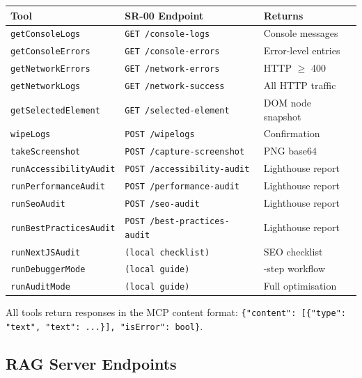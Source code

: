 \begin{longtable}[]{@{}
  >{\raggedright\arraybackslash}p{}
  >{\raggedright\arraybackslash}p{}
  >{\raggedright\arraybackslash}p{}@{}}
\toprule\noalign{}
\textbf{Tool} & \textbf{SR-00 Endpoint} & \textbf{Returns} \\
\midrule\noalign{}
\endhead
\bottomrule\noalign{}
\endlastfoot
\texttt{getConsoleLogs} & \texttt{GET /console-logs} & Console messages \\
\texttt{getConsoleErrors} & \texttt{GET /console-errors} & Error-level entries \\
\texttt{getNetworkErrors} & \texttt{GET /network-errors} & HTTP $\geq$ 400 \\
\texttt{getNetworkLogs} & \texttt{GET /network-success} & All HTTP traffic \\
\texttt{getSelectedElement} & \texttt{GET /selected-element} & DOM node snapshot \\
\texttt{wipeLogs} & \texttt{POST /wipelogs} & Confirmation \\
\texttt{takeScreenshot} & \texttt{POST /capture-screenshot} & PNG base64 \\
\texttt{runAccessibilityAudit} & \texttt{POST /accessibility-audit} & Lighthouse report \\
\texttt{runPerformanceAudit} & \texttt{POST /performance-audit} & Lighthouse report \\
\texttt{runSeoAudit} & \texttt{POST /seo-audit} & Lighthouse report \\
\texttt{runBestPracticesAudit} & \texttt{POST /best-practices-audit} & Lighthouse report \\
\texttt{runNextJSAudit} & \texttt{(local checklist)} & SEO checklist \\
\texttt{runDebuggerMode} & \texttt{(local guide)} & 8-step workflow \\
\texttt{runAuditMode} & \texttt{(local guide)} & Full optimisation \\
\end{longtable}

All tools return responses in the MCP content format: \texttt{\{"content": [\{"type": "text", "text": ...\}], "isError": bool\}}.

\subsection{RAG Server Endpoints}\label{fa_23:subsec:rag-endpoints}

